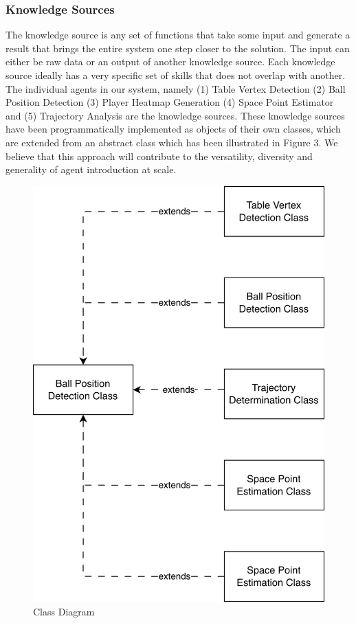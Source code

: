 \documentclass[conference]{IEEEtran}
\begin{document}
\subsubsection{Knowledge Sources}
The knowledge source is any set of functions that take some input and generate a result that brings the entire system one step closer to the solution. The input can either be raw data or an output of another knowledge source.
Each knowledge source ideally has a very specific set of skills that does not overlap with another.
The individual agents in our system, namely (1) Table Vertex Detection (2) Ball Position Detection (3) Player Heatmap Generation (4) Space Point Estimator and (5) Trajectory Analysis are the knowledge sources. 
These knowledge sources have been programmatically implemented as objects of their own classes, which are extended from an abstract class which has been illustrated in Figure 3.
We believe that this approach will contribute to the versatility, diversity and generality of agent introduction at scale.
\begin{figure}
    \centering
    \includegraphics[width=1\linewidth]{Class Diagram.png}
    \caption{Class Diagram}
    \label{fig:placeholder}
\end{figure}
\end{document}
